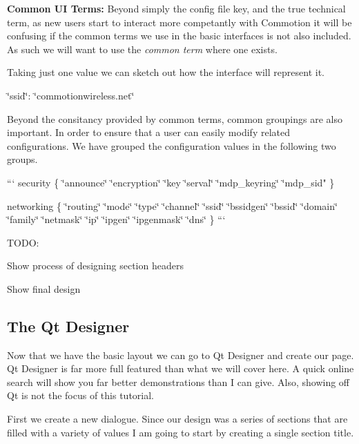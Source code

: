 {\bfseries Common U\-I Terms\-:} Beyond simply the config file key, and the true technical term, as new users start to interact more competantly with Commotion it will be confusing if the common terms we use in the basic interfaces is not also included. As such we will want to use the {\itshape common term} where one exists.

Taking just one value we can sketch out how the interface will represent it.

{\ttfamily \char`\"{}ssid\char`\"{}\-: \char`\"{}commotionwireless.\-net\char`\"{}}



Beyond the consitancy provided by common terms, common groupings are also important. In order to ensure that a user can easily modify related configurations. We have grouped the configuration values in the following two groups.

``` security \{ \char`\"{}announce\char`\"{} \char`\"{}encryption\char`\"{} \char`\"{}key
  \char`\"{}serval\char`\"{}
  \char`\"{}mdp\-\_\-keyring\char`\"{}
  \char`\"{}mdp\-\_\-sid" \}

networking \{ \char`\"{}routing\char`\"{} \char`\"{}mode\char`\"{} \char`\"{}type\char`\"{} \char`\"{}channel\char`\"{} \char`\"{}ssid\char`\"{} \char`\"{}bssidgen\char`\"{} \char`\"{}bssid\char`\"{} \char`\"{}domain\char`\"{} \char`\"{}family\char`\"{} \char`\"{}netmask\char`\"{} \char`\"{}ip\char`\"{} \char`\"{}ipgen\char`\"{} \char`\"{}ipgenmask\char`\"{} \char`\"{}dns\char`\"{} \} ```

T\-O\-D\-O\-:
\begin{DoxyItemize}
\item Show process of designing section headers
\item Show final design
\end{DoxyItemize}

\subsection*{The Qt Designer}

Now that we have the basic layout we can go to Qt Designer and create our page. Qt Designer is far more full featured than what we will cover here. A quick online search will show you far better demonstrations than I can give. Also, showing off Qt is not the focus of this tutorial.

First we create a new dialogue. Since our design was a series of sections that are filled with a variety of values I am going to start by creating a single section title.

